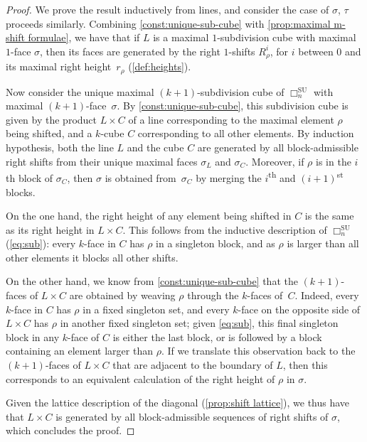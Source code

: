 \documentclass{amsart}
\theoremstyle{definition}
\newcommand{\ordinal}{\textsuperscript{th}} %
\newcommand{\ordinalst}{\textsuperscript{st}} %
\newcommand{\SU}{\mathrm{SU}}
\newcommand{\divcube}[1]{\Box_{#1}}
\begin{document}
\begin{proof}
We prove the result inductively from lines, and consider the case of $\sigma$, $\tau$ proceeds similarly.
Combining \cref{const:unique-sub-cube} with \cref{prop:maximal m-shift formulae}, we have that if $L$ is a maximal $1$-subdivision cube with maximal $1$-face $\sigma$, then its faces are generated by the right $1$-shifts $R_\rho^i$, for $i$ between $0$ and its maximal right height~$r_\rho$ (\cref{def:heights}).

Now consider the unique maximal $(k+1)$-subdivision cube of $\divcube{n}^\SU$ with maximal $(k+1)$-face~$\sigma$.
By \cref{const:unique-sub-cube}, this subdivision cube is given by the product $L\times C$ of a line corresponding to the maximal element $\rho$ being shifted, and a $k$-cube $C$ corresponding to all other elements.
By induction hypothesis, both the line $L$ and the cube $C$ are generated by all block-admissible right shifts from their unique maximal faces $\sigma_L$ and $\sigma_C$.
Moreover, if $\rho$ is in the $i$th block of $\sigma_C$, then $\sigma$ is obtained from~$\sigma_C$ by merging the $i$\ordinal{} and $(i+1)$\ordinalst{} blocks.

On the one hand, the right height of any element being shifted in $C$ is the same as its right height in $L\times C$.
This follows from the inductive description of $\divcube{n}^\SU$ (\cref{eq:sub}): every $k$-face in $C$ has $\rho$ in a singleton block, and as $\rho$ is larger than all other elements it blocks all other shifts.

On the other hand, we know from \cref{const:unique-sub-cube} that the $(k+1)$-faces of $L\times C$ are obtained by weaving $\rho$ through the $k$-faces of~$C$.
Indeed, every $k$-face in $C$ has $\rho$ in a fixed singleton set, and every $k$-face on the opposite side of $L\times C$ has $\rho$ in another fixed singleton set; given \cref{eq:sub}, this final singleton block in any $k$-face of $C$ is either the last block, or is followed by a block containing an element larger than $\rho$.
If we translate this observation back to the $(k+1)$-faces of $L\times C$ that are adjacent to the boundary of $L$, then this corresponds to an equivalent calculation of the right height of $\rho$ in $\sigma$.

Given the lattice description of the diagonal (\cref{prop:shift lattice}), we thus have that $L\times C$ is generated by all block-admissible sequences of right shifts of $\sigma$, which concludes the proof.
\end{proof}
\end{document}
